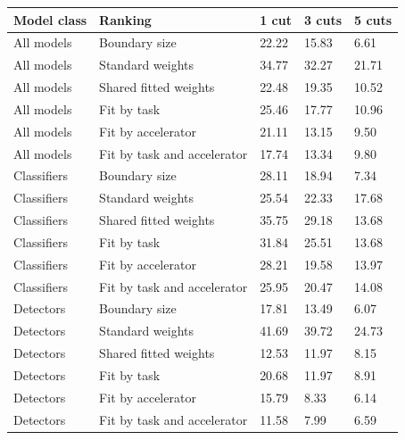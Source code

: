\begin{tabular}{@{}lllll@{}}
\toprule
Model class & Ranking & 1 cut & 3 cuts & 5 cuts \\
\midrule
All models & Boundary size & 22.22 & 15.83 & 6.61 \\
All models & Standard weights & 34.77 & 32.27 & 21.71 \\
All models & Shared fitted weights & 22.48 & 19.35 & 10.52 \\
All models & Fit by task & 25.46 & 17.77 & 10.96 \\
All models & Fit by accelerator & 21.11 & 13.15 & 9.50 \\
All models & Fit by task and accelerator & 17.74 & 13.34 & 9.80 \\
Classifiers & Boundary size & 28.11 & 18.94 & 7.34 \\
Classifiers & Standard weights & 25.54 & 22.33 & 17.68 \\
Classifiers & Shared fitted weights & 35.75 & 29.18 & 13.68 \\
Classifiers & Fit by task & 31.84 & 25.51 & 13.68 \\
Classifiers & Fit by accelerator & 28.21 & 19.58 & 13.97 \\
Classifiers & Fit by task and accelerator & 25.95 & 20.47 & 14.08 \\
Detectors & Boundary size & 17.81 & 13.49 & 6.07 \\
Detectors & Standard weights & 41.69 & 39.72 & 24.73 \\
Detectors & Shared fitted weights & 12.53 & 11.97 & 8.15 \\
Detectors & Fit by task & 20.68 & 11.97 & 8.91 \\
Detectors & Fit by accelerator & 15.79 & 8.33 & 6.14 \\
Detectors & Fit by task and accelerator & 11.58 & 7.99 & 6.59 \\
\bottomrule
\end{tabular}
